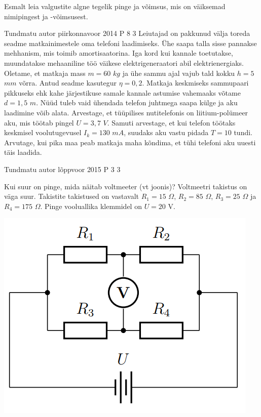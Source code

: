 \documentclass[11pt]{article}
\begin{document}
{{\ifHint
Esmalt leia valgustite algne tegelik pinge ja võimsus, mis on väiksemad nimipingest ja -võimsusest.
\fi
}

{Tundmatu autor} %
{piirkonnavoor} %
{2014} %
{P 8} %
{3} %
{
\ifStatement
Leiutajad on pakkunud välja toreda seadme matkainimestele oma telefoni laadimiseks. Ühe saapa talla sisse pannakse mehhanism, mis toimib amortisaatorina. Iga kord kui kannale toetutakse, muundatakse mehaaniline töö väikese elektrigeneraatori abil elektrienergiaks. Oletame, et matkaja mass $m = 60$ $kg$ ja ühe sammu ajal vajub tald kokku $h = 5$ $mm$ võrra. Antud seadme kasutegur $\eta = 0,2$. Matkaja keskmiseks sammupaari pikkuseks ehk kahe järjestikuse samale kannale astumise vahemaaks võtame $d = 1,5$ $m$. Nüüd tuleb vaid ühendada telefon juhtmega saapa külge ja aku laadimine võib alata. Arvestage, et tüüpilises nutitelefonis on liitium-polümeer aku, mis töötab pingel $U = 3,7$ $V$. Samuti arvestage, et kui telefon töötaks keskmisel voolutugevusel $I_k = 130$ $mA$, suudaks aku vastu pidada $T = 10$ tundi. Arvutage, kui pika maa peab matkaja maha kõndima, et tühi telefoni aku uuesti täis laadida.
\fi
}

{Tundmatu autor} %
{lõppvoor} %
{2015} %
{P 3} %
{3} %
{
\ifStatement
 Kui suur on pinge, mida näitab voltmeeter (vt joonis)? Voltmeetri takistus on väga suur. Takistite takistused on vastavalt $R_1 = 15$ $\Omega$, $R_2 = 85$ $\Omega$, $R_3 = 25$ $\Omega$ ja $R_4 = 175$ $\Omega$. Pinge vooluallika klemmidel on $U = 20$ V.
\begin{center}
	\includegraphics[width=0.5\linewidth]{2015-v3p-03-yl.png}
\end{center}
\fi
}

}
\end{document}
